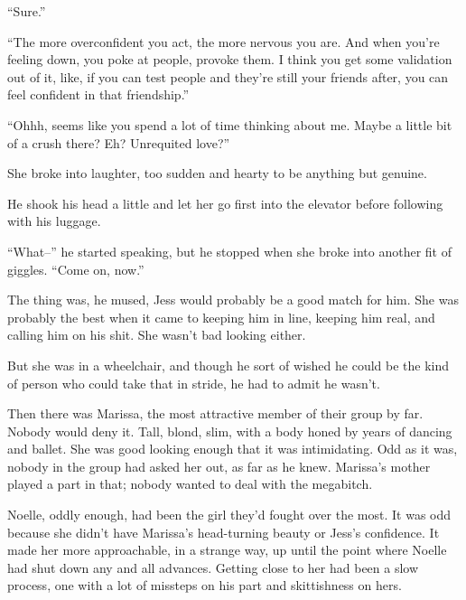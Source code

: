``Sure.''



``The more overconfident you act, the more nervous you are.  And when you're feeling down, you poke at people, provoke them.  I think you get some validation out of it, like, if you can test people and they're still your friends after, you can feel confident in that friendship.''



``Ohhh, seems like you spend a lot of time thinking about me.  Maybe a little bit of a crush there?  Eh?  Unrequited love?''



She broke into laughter, too sudden and hearty to be anything but genuine.



He shook his head a little and let her go first into the elevator before following with his luggage.



``What--'' he started speaking, but he stopped when she broke into another fit of giggles.  ``Come on, now.''



The thing was, he mused, Jess would probably be a good match for him.  She was probably the best when it came to keeping him in line, keeping him real, and calling him on his shit.  She wasn't bad looking either.



But she was in a wheelchair, and though he sort of wished he could be the kind of person who could take that in stride, he had to admit he wasn't.



Then there was Marissa, the most attractive member of their group by far.  Nobody would deny it.  Tall, blond, slim, with a body honed by years of dancing and ballet.  She was good looking enough that it was intimidating.  Odd as it was, nobody in the group had asked her out, as far as he knew.  Marissa's mother played a part in that; nobody wanted to deal with the megabitch.



Noelle, oddly enough, had been the girl they'd fought over the most.  It was odd because she didn't have Marissa's head-turning beauty or Jess's confidence.  It made her more approachable, in a strange way, up until the point where Noelle had shut down any and all advances.  Getting close to her had been a slow process, one with a lot of missteps on his part and skittishness on hers.



